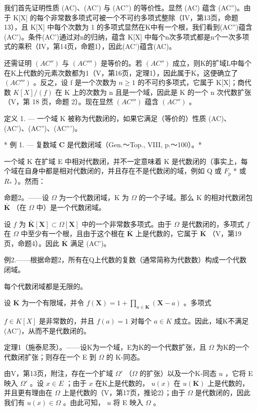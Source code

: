 我们首先证明性质 (AC)、(AC') 与 (AC'') 的等价性。显然 (AC) 蕴含 (AC'')。由于 K{[}X{]} 的每个非常数多项式可被一个不可约多项式整除（IV，第13页，命题13），且 K{[}X{]} 中每个次数为 1 的多项式显然在K中有一个根，我们看到(AC'')蕴含(AC')。条件(AC')通过对n的归纳，蕴含 K{[}X{]} 中每个n次多项式都是n个一次多项式的乘积（IV，第14页，命题1），因此(AC')蕴含(AC)。

还需证明 \((AC'')\) 与 \((AC''')\) 是等价的。若 \((AC'')\) 成立，则K的扩域L中每个在K上代数的元素次数都为1（V，第16页，定理1），因此属于K，这便确立了 \((AC''')\) 。反之，设 f 是一个次数为 \(n \geqslant 1\) 的不可约多项式，它属于 K{[}X{]}；商代数 \(K[X]/(f)\) 在 K 上的次数为 n 且是一个域，因此是 K 的一个 n 次代数扩张（V，第 18 页，命题 2）。现在显然 \((AC''')\) 蕴含 \((AC'')\) 。

定义 1. --- 一个域 K 被称为代数闭的，如果它满足（等价的）性质 (AC)、(AC')、(AC'')、(AC''')。

* 例 1. --- 复数域 \(\mathbf{C}\) 是代数闭域（Gen.～Top., VIII, p.～100）。*

一个域 K 在扩域 E 中相对代数闭，并不一定意味着 K 是代数闭的（事实上，每个域在自身中都是相对代数闭的，并且存在不是代数闭的域，例如 Q 或 \(F_{p}\) * 或 \(R_{*}\) ）。然而：

命题2。——设 \(\Omega\) 为一个代数闭域，K 为 \(\Omega\) 的一个子域。那么 K 的相对代数闭包 \(\bar{\mathbf{K}}\) （在 \(\Omega\) 中）是一个代数闭域。

设 \(f\) 为 \(\bar{\mathbf{K}}[\mathbf{X}] \subset \Omega[\mathbf{X}]\) 中的一个非常数多项式。由于 \(\Omega\) 是代数闭的，多项式 \(f\) 在 \(\Omega\) 中至少有一个根，且由于这个根在 \(\bar{\mathbf{K}}\) 上是代数的，它属于 \(\bar{\mathbf{K}}\) （V，第19页，命题4）。因此 \(\bar{\mathbf{K}}\) 满足 (AC')。

例2.——根据命题2，所有在Q上代数的复数（通常简称为代数数）构成一个代数闭域。

每个代数闭域都是无限的。

设 \(\mathbf{K}\) 为一个有限域，并令 \(f(\mathbf{X}) = 1 + \prod_{a\in \mathbf{K}}(\mathbf{X} - a)\) 。多项式

\(f \in K[X]\) 是非常数的，并且 \(f(a) = 1\) 对每个 \(a \in K\) 成立。因此，域K不满足(AC')，从而不是代数闭的。

定理1（施泰尼茨）。——设K为一个域，E为K的一个代数扩张，且 \(\Omega\) 为K的一个代数闭扩张；则存在一个 E 到 \(\Omega\) 的 K-同态。

由V，第13页，附注，存在一个扩域 \(\Omega'\) （\(\Omega\) 的扩张）以及一个K-同态 \(u\) ，它将 E 映入 \(\Omega'\) 。设 \(x \in E\) ；由于 \(x\) 在K上是代数的， \(u(x)\) 在 \(u(\mathbf{K})\) 上是代数的，并且更有理由在 \(\Omega\) 上是代数的（V，第17页，推论2）；由于 \(\Omega\) 是代数闭的，因此我们有 \(u(x) \in \Omega\) 。由此可知， \(u\) 将 E 映入 \(\Omega\) 。


